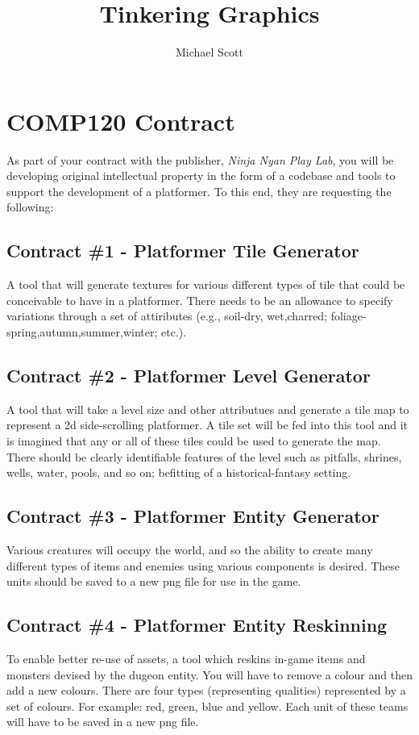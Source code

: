 \documentclass{../../fal_assignment}
\title{Tinkering Graphics}
\author{Michael Scott}
\begin{document}
\section*{COMP120 Contract}

As part of your contract with the publisher, \textit{Ninja Nyan Play Lab}, you will be developing original intellectual property in the form of a codebase and tools to support the development of a platformer. To this end, they are requesting the following:

\subsection*{Contract \#1 - Platformer Tile Generator}
A tool that will generate textures for various different types of tile that could be conceivable to have in a platformer. There needs to be an allowance to specify variations through a set of attiributes (e.g., soil-dry, wet,charred; foliage-spring,autumn,summer,winter; etc.).

\subsection*{Contract \#2 - Platformer Level Generator}
A tool that will take a level size and other attributues and generate a tile map to represent a 2d side-scrolling platformer. A tile set will be fed into this tool and it is imagined that any or all of these tiles could be used to generate the map. There should be clearly identifiable features of the level such as pitfalls, shrines, wells, water, pools, and so on; befitting of a historical-fantasy setting.

\subsection*{Contract \#3 - Platformer Entity Generator}
Various creatures will occupy the world, and so the ability to create many different types of items and enemies using various components is desired. These units should be saved to a new png file for use in the game.

\subsection*{Contract \#4 - Platformer Entity Reskinning}
To enable better re-use of assets, a tool which reskins in-game items and monsters devised by the dugeon entity. You will have to remove a colour and then add a new colours. There are four types (representing qualities) represented by a set of colours. For example: red, green, blue and yellow. Each unit of these teams will have to be saved in a new png file.
\end{document}
